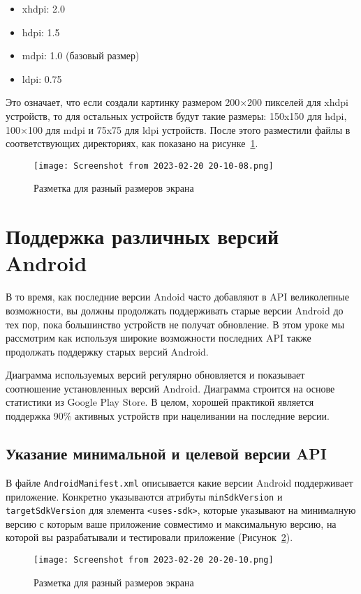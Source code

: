 \begin{itemize}
	\item xhdpi: 2.0
	\item hdpi: 1.5
	\item mdpi: 1.0 (базовый размер)
	\item ldpi: 0.75
\end{itemize}

Это означает, что если создали картинку размером 200×200 пикселей для
xhdpi устройств, то для остальных устройств будут такие размеры: 150x150
для hdpi, 100×100 для mdpi и 75x75 для ldpi устройств.
После этого разместили файлы в соответствующих директориях, как показано
на рисунке~\ref{fig:res:drawable}.
\begin{figure}[h!tp]
	\centering
	\texttt{[image: Screenshot from 2023-02-20 20-10-08.png]}
	\caption{Разметка для разный размеров экрана}
	\label{fig:res:drawable}
\end{figure}

\section{Поддержка различных версий Android}
В то время, как последние версии Andoid часто добавляют в API
великолепные возможности, вы должны продолжать поддерживать старые
версии Android до тех пор, пока большинство устройств не получат
обновление. В этом уроке мы рассмотрим как используя широкие
возможности последних API также продолжать поддержку старых версий
Android.\par
Диаграмма используемых версий регулярно обновляется и показывает
соотношение установленных версий Android. Диаграмма строится на основе
статистики из Google Play Store. В целом, хорошей практикой является
поддержка 90\% активных устройств при нацеливании на последние версии.

\subsection{Указание минимальной и целевой версии API}
В файле \texttt{AndroidManifest.xml} описывается какие версии Android
поддерживает приложение. Конкретно указываются атрибуты
\texttt{minSdkVersion} и \texttt{targetSdkVersion} для
элемента \texttt{<uses-sdk>}, которые указывают на минималную версию
с которым ваше приложение совместимо и максимальную версию,
на которой вы разрабатывали и тестировали приложение
(Рисунок~\ref{fig:manifest}).
\begin{figure}[h!tp]
	\centering
	\texttt{[image: Screenshot from 2023-02-20 20-20-10.png]}
	\caption{Разметка для разный размеров экрана}
	\label{fig:manifest}
\end{figure}

